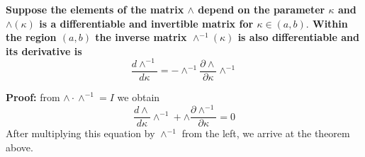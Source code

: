 \begin{thm}
\textbf{Suppose the elements of the matrix $\wedge$ depend on the parameter $\kappa$ and $\wedge(\kappa)$ is a differentiable and invertible matrix for $\kappa\in(a, b) .$ Within the region $(a, b)$ the inverse matrix $\wedge^{-1}(\kappa)$ is also differentiable and its derivative is}
\begin{equation}
\frac{d \wedge^{-1}}{d \kappa}=-\wedge^{-1} \frac{\partial \wedge}{\partial \kappa} \wedge^{-1}
\label{wedge-theorem}
\end{equation}
\end{thm}
\textbf{Proof:} from $\wedge \cdot \wedge^{-1}=I$ we obtain
$$
\frac{d \wedge}{d \kappa} \wedge^{-1}+\wedge \frac{\partial \wedge^{-1}}{\partial \kappa}=0
$$
After multiplying this equation by $\wedge^{-1}$ from the left, we arrive at the theorem above. 

